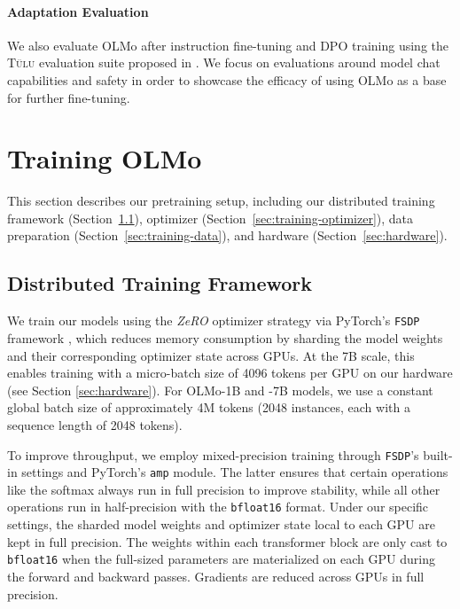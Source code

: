 \documentclass[11pt]{article}
\newcommand{\olmo}{OLMo\xspace}
\newcommand{\tulu}{\textsc{T\"ulu}\xspace}
\newcommand{\note}[4][]{\todo[author=#2,color=#3,fancyline,caption={}]{#4}} %
\newcommand{\kyler}[2][]{\note[#1]{\texttt{kyler}}{green!40}{#2}}
\begin{document}
\paragraph{Adaptation Evaluation} We also evaluate \olmo after instruction fine-tuning and DPO training using the \tulu evaluation suite proposed in \citet{wang2023far, ivison2023camels}.
We focus on evaluations around model chat capabilities and safety in order to showcase the efficacy of using \olmo as a base for further fine-tuning.

\section{Training \olmo}

This section describes our pretraining setup, including our distributed training framework (Section~\ref{sec:training-distributed}), optimizer  (Section~\ref{sec:training-optimizer}), data preparation (Section~\ref{sec:training-data}), and hardware (Section~\ref{sec:hardware}).

\subsection{Distributed Training Framework}
\label{sec:training-distributed}

We train our models using the \emph{ZeRO} optimizer strategy \citep{Rajbhandari2019ZeRO} via PyTorch's \texttt{FSDP} framework \citep{Zhao2023PyTorchFSDP}, which reduces memory consumption by sharding the model weights and their corresponding optimizer state across GPUs.
At the 7B scale, this enables training with a micro-batch size of 4096 tokens per GPU on our hardware (see Section \ref{sec:hardware}).
For \olmo-1B and -7B models, we use a constant global batch size of approximately 4M tokens (2048 instances, each with a sequence length of 2048 tokens).

To improve throughput, we employ mixed-precision training \citep{Micikevicius2017MixedPT} through \texttt{FSDP}'s built-in settings and PyTorch's \texttt{amp} module.
The latter ensures that certain operations like the softmax always run in full precision to improve stability, while all other operations run in half-precision with the \texttt{bfloat16} format. %
Under our specific settings, the sharded model weights and optimizer state local to each GPU are kept in full precision.
The weights within each transformer block are only cast to \texttt{bfloat16} when the full-sized parameters are materialized on each GPU during the forward and backward passes.
Gradients are reduced across GPUs in full precision.
\end{document}
